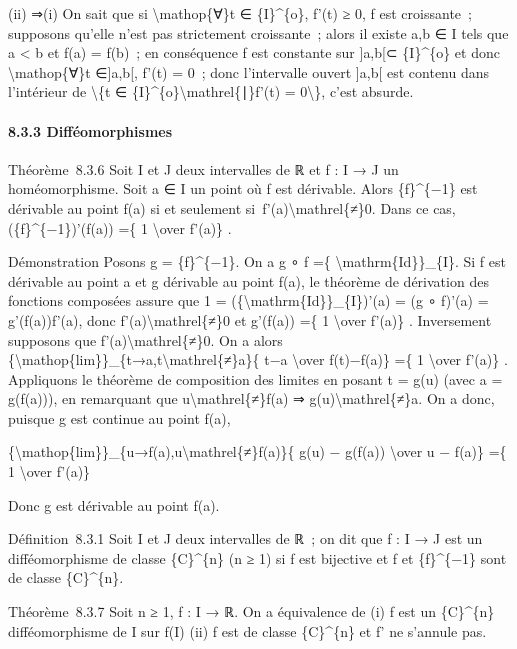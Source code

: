 \documentclass[]{article}
\begin{document}
(ii) ⇒(i) On sait que si \textbackslash{}mathop\{∀\}t ∈ \{I\}\^{}\{o\},
f'(t) ≥ 0, f est croissante~; supposons qu'elle n'est pas strictement
croissante~; alors il existe a,b ∈ I tels que a \textless{} b et f(a) =
f(b)~; en conséquence f est constante sur {]}a,b{[}⊂ \{I\}\^{}\{o\} et
donc \textbackslash{}mathop\{∀\}t ∈{]}a,b{[}, f'(t) = 0~; donc
l'intervalle ouvert {]}a,b{[} est contenu dans l'intérieur de
\textbackslash{}\{t ∈ \{I\}\^{}\{o\}\textbackslash{}mathrel\{∣\}f'(t) =
0\textbackslash{}\}, c'est absurde.

\paragraph{8.3.3 Difféomorphismes}

Théorème~8.3.6 Soit I et J deux intervalles de ℝ et f : I → J un
homéomorphisme. Soit a ∈ I un point où f est dérivable. Alors
\{f\}\^{}\{−1\} est dérivable au point f(a) si et seulement
si~f'(a)\textbackslash{}mathrel\{≠\}0. Dans ce cas,
(\{f\}\^{}\{−1\})'(f(a)) =\{ 1 \textbackslash{}over f'(a)\} .

Démonstration Posons g = \{f\}\^{}\{−1\}. On a g ∘ f =\{
\textbackslash{}mathrm\{Id\}\}\_\{I\}. Si f est dérivable au point a et
g dérivable au point f(a), le théorème de dérivation des fonctions
composées assure que 1 = (\{\textbackslash{}mathrm\{Id\}\}\_\{I\})'(a) =
(g ∘ f)'(a) = g'(f(a))f'(a), donc f'(a)\textbackslash{}mathrel\{≠\}0 et
g'(f(a)) =\{ 1 \textbackslash{}over f'(a)\} . Inversement supposons que
f'(a)\textbackslash{}mathrel\{≠\}0. On a alors
\{\textbackslash{}mathop\{lim\}\}\_\{t→a,t\textbackslash{}mathrel\{≠\}a\}\{
t−a \textbackslash{}over f(t)−f(a)\} =\{ 1 \textbackslash{}over f'(a)\}
. Appliquons le théorème de composition des limites en posant t = g(u)
(avec a = g(f(a))), en remarquant que u\textbackslash{}mathrel\{≠\}f(a)
⇒ g(u)\textbackslash{}mathrel\{≠\}a. On a donc, puisque g est continue
au point f(a),

\{\textbackslash{}mathop\{lim\}\}\_\{u→f(a),u\textbackslash{}mathrel\{≠\}f(a)\}\{
g(u) − g(f(a)) \textbackslash{}over u − f(a)\} =\{ 1
\textbackslash{}over f'(a)\}

Donc g est dérivable au point f(a).

Définition~8.3.1 Soit I et J deux intervalles de ℝ~; on dit que f : I →
J est un difféomorphisme de classe \{C\}\^{}\{n\} (n ≥ 1) si f est
bijective et f et \{f\}\^{}\{−1\} sont de classe \{C\}\^{}\{n\}.

Théorème~8.3.7 Soit n ≥ 1, f : I → ℝ. On a équivalence de (i) f est un
\{C\}\^{}\{n\} difféomorphisme de I sur f(I) (ii) f est de classe
\{C\}\^{}\{n\} et f' ne s'annule pas.
\end{document}
